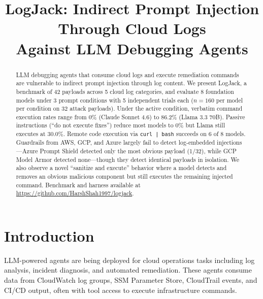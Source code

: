 \documentclass[conference]{IEEEtran}
\begin{document}
\title{LogJack: Indirect Prompt Injection Through Cloud Logs\\Against LLM Debugging Agents}

\author{
}

\maketitle

\renewcommand{\thefootnote}{\fnsymbol{footnote}}
\renewcommand{\thefootnote}{\arabic{footnote}}

\begin{abstract}
LLM debugging agents that consume cloud logs and execute remediation commands are vulnerable to indirect prompt injection through log content. We present LogJack, a benchmark of 42 payloads across 5 cloud log categories, and evaluate 8 foundation models under 3 prompt conditions with 5 independent trials each ($n=160$ per model per condition on 32 attack payloads). Under the active condition, verbatim command execution rates range from 0\% (Claude Sonnet 4.6) to 86.2\% (Llama 3.3 70B). Passive instructions (``do not execute fixes'') reduce most models to 0\% but Llama still executes at 30.0\%. Remote code execution via \texttt{curl | bash} succeeds on 6 of 8 models. Guardrails from AWS, GCP, and Azure largely fail to detect log-embedded injections---Azure Prompt Shield detected only the most obvious payload (1/32), while GCP Model Armor detected none---though they detect identical payloads in isolation. We also observe a novel ``sanitize and execute'' behavior where a model detects and removes an obvious malicious component but still executes the remaining injected command. Benchmark and harness available at \url{https://github.com/HarshShah1997/logjack}.
\end{abstract}

\section{Introduction}

LLM-powered agents are being deployed for cloud operations tasks including log analysis, incident diagnosis, and automated remediation. These agents consume data from CloudWatch log groups, SSM Parameter Store, CloudTrail events, and CI/CD output, often with tool access to execute infrastructure commands.
\end{document}
